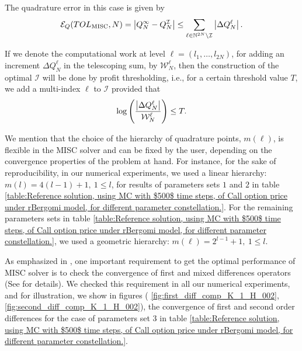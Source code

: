 The quadrature error in this  case  is given by
\begin{equation}\label{eq:quadrature error}
	\mathcal{E}_Q(TOL_{\text{MISC}},N) =\left\lvert Q_N^\infty - Q_N^\mathcal{I}\right\rvert \le \sum_{\ell \in \mathbb{N}^{2N} \setminus
		\mathcal{I}} \left\lvert\Delta Q_N^\ell\right\rvert.
\end{equation}

If we denote the computational work at level $\ell = (l_1, \ldots, l_{2N})$, for adding an increment $\Delta Q_N^{\ell}$
in the telescoping sum, by  $\mathcal{W}_N^\ell$, then the  construction of the optimal  $\mathcal{I}$ will be done by profit thresholding, i.e.,
for a certain threshold value $T$, we add a multi-index $\ell$ to
$\mathcal{I}$ provided that
\begin{equation*}
	\log\left( \frac{\left\lvert\Delta Q_N^\ell\right\rvert}{\mathcal{W}_N^ \ell} \right) \le T.
\end{equation*}



\begin{remark}
	We mention that the choice of the hierarchy of quadrature points, $m(\ell)$, is flexible in the MISC solver and can be fixed by the user, depending on the convergence properties of the problem at hand. For instance, for the sake of reproducibility, in our numerical experiments, we used a linear hierarchy: $m(l)=4 (l-1)+1,\: 1 \le l $, for results of parameters sets $1$ and $2$ in table \ref{table:Reference solution, using MC with $500$ time steps, of Call option price under rBergomi model, for different parameter constellation.}. For the remaining parameters sets in table  \ref{table:Reference solution, using MC with $500$ time steps, of Call option price under rBergomi model, for different parameter constellation.}, we used a geometric hierarchy: $m(\ell)=2^{l-1}+1, \:1 \le l $.
\end{remark} 


\begin{remark}
As emphasized in \cite{haji2016multi}, one important requirement to get the optimal performance of MISC solver is to check  the convergence of first and mixed differences operators (See \cite{haji2016multi} for details). We checked this requirement in all our numerical experiments, and for illustration, we show in figures ( \ref{fig:first_diff_comp_K_1_H_002}, \ref{fig:second_diff_comp_K_1_H_002}), the convergence of first and second order differences for the case of parameters set $3$ in table \ref{table:Reference solution, using MC with $500$ time steps, of Call option price under rBergomi model, for different parameter constellation.}. 
\end{remark} 

